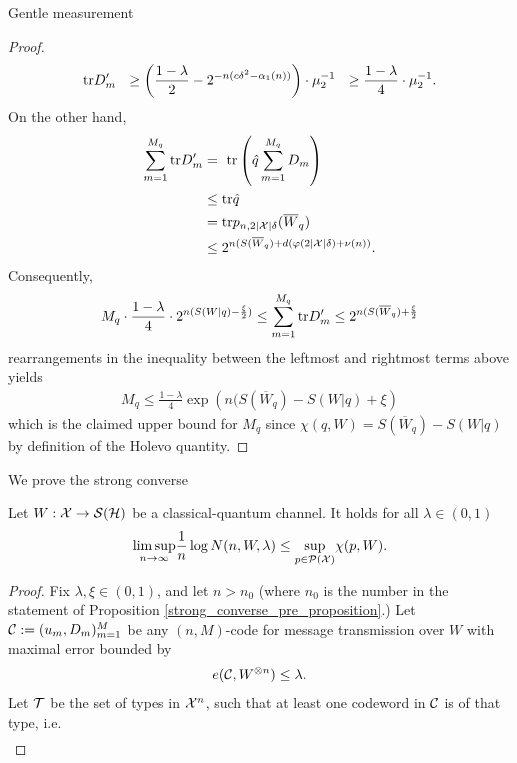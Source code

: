 \begin{subsubsection}{Gentle measurement}
\begin{proof}
\begin{align}
          \tr D'_m \
          \ \geq \left(\frac{1-\lambda}{2} - 2^{-n(c\delta^2 -\alpha_1(n))} \right)\cdot \mu_2^{-1} \ 
          \ \geq \frac{1-\lambda }{4} \cdot \mu_2^{-1}.
         \end{align}
	  On the other hand, 
	  \begin{align}
	   \sum_{m=1}^{M_q} \mathrm{tr} D'_m 
	   & = \ \mathrm{tr}\left(\hat{q} \sum_{m=1}^{M_q} D_m \right) \\
	   & \leq \mathrm{tr} \hat{q} \\
	   & = \mathrm{tr} p_{n, 2|{\mathcal X}|\delta}(\overline{W}_q) \\
	   & \leq 2^{n(S(\overline{W}_q)+ d(\varphi(2 |{\mathcal X}| \delta) + \nu(n))}.
	  \end{align}
	  Consequently,
	  \begin{align}
	   M_q \cdot \frac{1-\lambda}{4} \cdot 2^{n(S(W|q) - \frac{\xi}{2})} \leq \sum_{m=1}^{M_q} \mathrm{tr} D'_m \leq 2^{n(S(\overline{W}_q) + \frac{\xi}{2}}
	  \end{align}
	  rearrangements in the inequality between the leftmost and rightmost terms above yields 
	  \begin{align}
	   M_q \leq \frac{1 - \lambda}{4} \exp\left(n(S(\overline{W}_q) - S(W|q) + \xi \right)
	  \end{align}
	  which is the claimed upper bound for $M_q$ since $\chi(q,W) = S(\overline{W}_q) - S(W|q)$ by definition of the Holevo quantity. 
	\end{proof}
	We prove the strong converse
	\begin{theorem}
	 Let $W: {\mathcal X} \rightarrow {\mathcal S}({\mathcal H})$ be a classical-quantum channel. It holds for all $\lambda \in (0,1)$ 
	 \begin{align}
	  \underset{n \rightarrow \infty}{\limsup} \frac{1}{n} \log N(n,W,\lambda) \leq \underset{p \in {\mathcal P}({\mathcal X})}{\sup} \chi(p,W).
	 \end{align}
	\end{theorem}
	\begin{proof}
	 Fix $\lambda, \xi \in (0,1)$, and let $n > n_0$ (where $n_0$ is the number in the statement of Proposition \ref{strong_converse_pre_proposition}.) Let ${\mathcal C} := (u_m, D_m)_{m=1}^M$ 
	 be any $(n,M)$-code for message transmission over $W$ with maximal error bounded by 
	 \begin{align}
	  e({\mathcal C}, W^{\otimes n}) \leq \lambda.
	 \end{align}
         Let ${\mathcal T}$ be the set of types in ${\mathcal X}^n$, such that at least one codeword in ${\mathcal C}$ is of that type, i.e. 
         \begin{align}

\end{align}
\end{proof}
\end{subsubsection}
